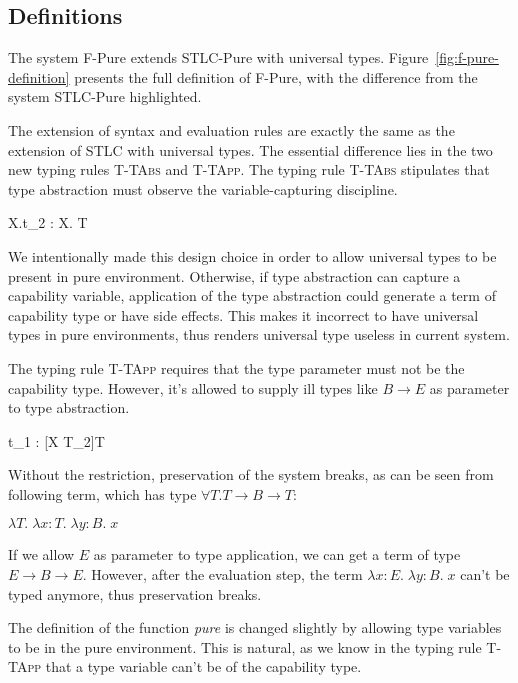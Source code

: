 \subsection{Definitions}

The system F-Pure extends STLC-Pure with universal
types. Figure~\ref{fig:f-pure-definition} presents the full definition
of F-Pure, with the difference from the system STLC-Pure highlighted.

The extension of syntax and evaluation rules are exactly the same as
the extension of STLC with universal types.  The essential difference
lies in the two new typing rules \textsc{T-TAbs} and
\textsc{T-TApp}. The typing rule \textsc{T-TAbs} stipulates that type
abstraction must observe the variable-capturing discipline.

{ \Gamma \vdash \lambda X.t_2 : \forall X. T }

We intentionally made this design choice in order to allow universal
types to be present in pure environment. Otherwise, if type
abstraction can capture a capability variable, application of the type
abstraction could generate a term of capability type or have side
effects. This makes it incorrect to have universal types in pure
environments, thus renders universal type useless in current system.

The typing rule \textsc{T-TApp} requires that the type parameter must
not be the capability type. However, it's allowed to supply ill types
like $B \to E$ as parameter to type abstraction.


{ \Gamma \vdash t_1 \; [T_2] : [X \mapsto T_2]T }

Without the restriction, preservation of the system breaks, as can be
seen from following term, which has type $\forall T. T \to B \to T$:

\begin{center}
  $\lambda T. \; \lambda x:T. \; \lambda y:B. \; x$
\end{center}

If we allow $E$ as parameter to type application, we can get a term of
type $E \to B \to E$. However, after the evaluation step, the term
$\lambda x:E. \; \lambda y:B. \; x$ can't be typed anymore, thus
preservation breaks.

The definition of the function \emph{pure} is changed slightly by
allowing type variables to be in the pure environment. This is
natural, as we know in the typing rule \textsc{T-TApp} that a type
variable can't be of the capability type.

